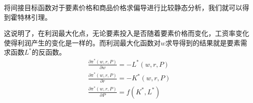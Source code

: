 \documentclass[UTF8,12pt]{ctexart}
\numberwithin{equation}{section} %
\numberwithin{figure}{section}
\numberwithin{table}{section}
\begin{document}
	将间接目标函数对于要素价格和商品价格求偏导进行比较静态分析，我们就可以得到霍特林引理。
	
	这说明了，在利润最大化点，无论要素投入是否随着要素价格而变化，工资率变化使得利润产生的变化是一样的。而利润最大化函数对$w$求导得到的结果就是要素需求函数$L^*$的反函数。
	\begin{equation}
		\begin{aligned}
			&\frac{\partial \pi^*(w,r,P)}{\partial w} = -L^*(w,r,P) \\
			&\frac{\partial \pi^*(w,r,P)}{\partial r} = -K^*(w,r,P) \\
			&\frac{\partial \pi^*(w,r,P)}{\partial P} = f(K^*,L^*) \\
		\end{aligned}
	\end{equation}
	
\end{document}
